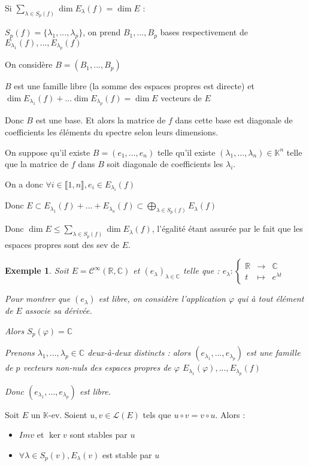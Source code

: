 \documentclass[a4paper,12pt]{book}
\newcommand{\Prop}[2]{\begin{tcolorbox}[sharp corners, colback=white,colframe=red!90!black!75, title=Proposition : #1]#2\end{tcolorbox}}
\newcommand{\Pre}[1]{\begin{tcolorbox}[sharp corners, colback=white,colframe=green!60!green!30!black!75, title=Preuve]#1\end{tcolorbox}}
\newtheorem{Exe}{Exemple}[section]
\def\R{\mathbb{R}}
\def\C{\mathbb{C}}
\def\K{\mathbb{K}}
\begin{document}
\Pre{Si $\sum\limits_{\lambda\in S_p(f)}\dim E_\lambda(f)=\dim E$ : \par $S_p(f)=\{\lambda_1,...,\lambda_p\}$, on prend $B_1,...,B_p$ bases respectivement de $E_{\lambda_1}(f),...,E_{\lambda_p}(f)$ \par On considère $B=(B_1,...,B_p)$ \par $B$ est une famille libre (la somme des espaces propres est directe) et $\dim E_{\lambda_1}(f)+...\dim E_{\lambda_p}(f) =\dim E$ vecteurs de $E$ \par Donc $B$ est une base. Et alors la matrice de $f$ dans cette base est diagonale de coefficients les éléments du spectre selon leurs dimensions.
\par On suppose qu'il existe $B=(e_1,...,e_n)$ telle qu'il existe $(\lambda_1,...,\lambda_n)\in\K^n$ telle que la matrice de $f$ dans $B$ soit diagonale de coefficients les $\lambda_i$. \par On a donc $\forall i\in\llbracket 1,n\rrbracket, e_i\in E_{\lambda_i}(f)$ \par Donc $E\subset E_{\lambda_1}(f)+...+E_{\lambda_n}(f)\subset\bigoplus\limits_{\lambda\in S_p(f)}E_\lambda(f)$ \par Donc $\dim E\leq \sum\limits_{\lambda\in S_p(f)}\dim E_{\lambda}(f)$, l'égalité étant assurée par le fait que les espaces propres sont des sev de $E$.}
\begin{Exe}
Soit $E=\mathcal{C}^\infty(\R,\C)$ et $(e_\lambda)_{\lambda\in\C}$ telle que : $e_\lambda:\left\{\begin{array}{rcl} \R & \to & \C \\ t & \mapsto & e^{\lambda t} \end{array}\right.$ \par Pour montrer que $(e_\lambda)$ est libre, on considère l'application $\varphi$ qui à tout élément de $E$ associe sa dérivée. \par Alors $S_p(\varphi)=\C$\par Prenons $\lambda_1,...,\lambda_p\in\C$ deux-à-deux distincts : alors $(e_{\lambda_1},...,e_{\lambda_p})$ est une famille de $p$ vecteurs non-nuls des espaces propres de $\varphi$ $E_{\lambda_1}(\varphi),...,E_{\lambda_p}(f)$ \par Donc $(e_{\lambda_1},...,e_{\lambda_p})$ est libre.
\end{Exe}
\Prop{}{Soit $E$ un $\K$-ev. Soient $u,v\in\mathcal{L}(E)$ tels que $u\circ v=v\circ u$. Alors :\begin{itemize}
\item $Im v$ et $\ker v$ sont stables par $u$
\item $\forall\lambda\in S_p(v), E_\lambda(v)$ est stable par $u$
\end{itemize}}
\end{document}
